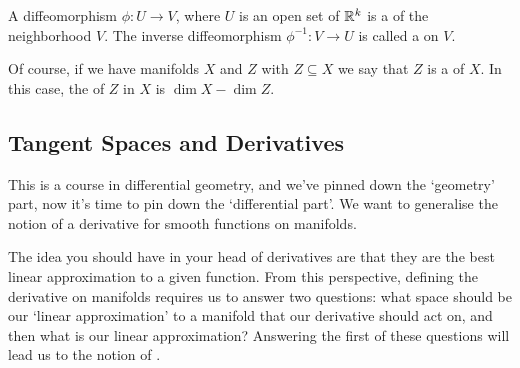 \documentclass[a4paper]{scrartcl}
\begin{document}
\begin{definition}[Chart]
    A diffeomorphism $\phi: U \rightarrow V$, where $U$ is an open set of $\mathbb{R}^k$ is a  of the neighborhood $V$. The inverse diffeomorphism $\phi^{-1}: V \rightarrow U$ is called a  on $V$.
\end{definition}

Of course, if we have manifolds $X$ and $Z$ with $Z \subseteq X$ we say that $Z$ is a  of $X$. In this case, the  of $Z$ in $X$ is $\dim X - \dim Z$.

\subsection{Tangent Spaces and Derivatives}

This is a course in differential geometry, and we've pinned down the `geometry' part, now it's time to pin down the `differential part'. We want to generalise the notion of a derivative for smooth functions on manifolds. 

The idea you should have in your head of derivatives are that they are the best linear approximation to a given function. From this perspective, defining the derivative on manifolds requires us to answer two questions: 
what space should be our `linear approximation' to a manifold that our derivative should act on, and then what is our linear approximation? Answering the first of these questions will lead us to the notion of .
\end{document}
